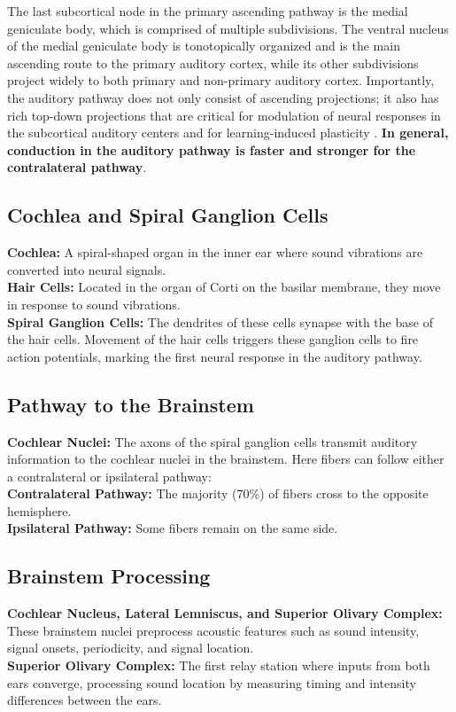 \documentclass{article}
\begin{document}
The last subcortical node in the primary ascending pathway is the medial geniculate body, which is comprised of multiple subdivisions. The ventral nucleus of the medial geniculate body is tonotopically organized and is the main ascending route to the primary auditory cortex, while its other subdivisions project widely to both primary and non-primary auditory cortex. Importantly, the auditory pathway does not only consist of ascending projections; it also has rich top-down projections that are critical for modulation of neural responses in the subcortical auditory centers and for learning-induced plasticity \citep{bajo2010,suga2003}. \textbf{In general, conduction in the auditory pathway is faster and stronger for the contralateral pathway}.


\subsection{Cochlea and Spiral Ganglion Cells}
    \textbf{Cochlea:} A spiral-shaped organ in the inner ear where sound vibrations are converted into neural signals. \\
    \textbf{Hair Cells:} Located in the organ of Corti on the basilar membrane, they move in response to sound vibrations. \\
    \textbf{Spiral Ganglion Cells:} The dendrites of these cells synapse with the base of the hair cells. Movement of the hair cells triggers these ganglion cells to fire action potentials, marking the first neural response in the auditory pathway.
    
\subsection{Pathway to the Brainstem}
    \textbf{Cochlear Nuclei:} The axons of the spiral ganglion cells transmit auditory information to the cochlear nuclei in the brainstem. Here fibers can follow either a contralateral or ipsilateral pathway: \\
    \textbf{Contralateral Pathway:} The majority (70\%) of fibers cross to the opposite hemisphere. \\
    \textbf{Ipsilateral Pathway:} Some fibers remain on the same side.
    
\subsection{Brainstem Processing}
\textbf{Cochlear Nucleus, Lateral Lemniscus, and Superior Olivary Complex:} These brainstem nuclei preprocess acoustic features such as sound intensity, signal onsets, periodicity, and signal location. \\
\textbf{Superior Olivary Complex:} The first relay station where inputs from both ears converge, processing sound location by measuring timing and intensity differences between the ears.
\end{document}

